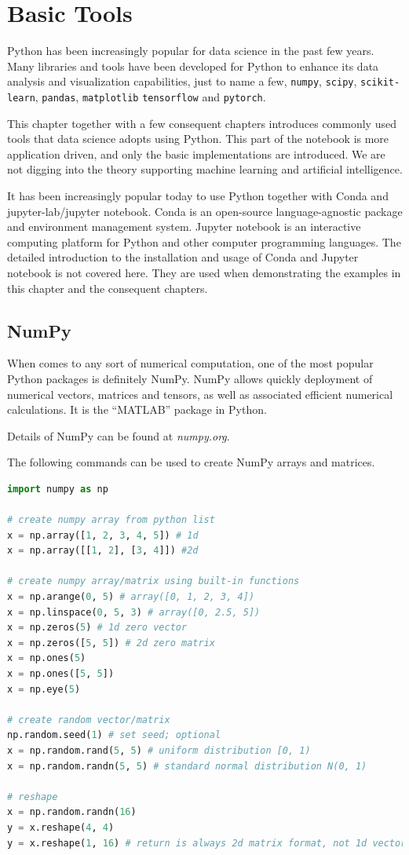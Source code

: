 \chapter{Basic Tools} \label{ch:numpyscipy}

Python has been increasingly popular for data science in the past few years. Many libraries and tools have been developed for Python to enhance its data analysis and visualization capabilities, just to name a few, \verb|numpy|, \verb|scipy|, \verb|scikit-learn|, \verb|pandas|, \verb|matplotlib| \verb|tensorflow| and \verb|pytorch|.

This chapter together with a few consequent chapters introduces commonly used tools that data science adopts using Python. This part of the notebook is more application driven, and only the basic implementations are introduced. We are not digging into the theory supporting machine learning and artificial intelligence.

It has been increasingly popular today to use Python together with Conda and jupyter-lab/jupyter notebook. Conda is an open-source language-agnostic package and environment management system. Jupyter notebook is an interactive computing platform for Python and other computer programming languages. The detailed introduction to the installation and usage of Conda and Jupyter notebook is not covered here. They are used when demonstrating the examples in this chapter and the consequent chapters.

\section{NumPy}

When comes to any sort of numerical computation, one of the most popular Python packages is definitely NumPy. NumPy allows quickly deployment of numerical vectors, matrices and tensors, as well as associated efficient numerical calculations. It is the ``MATLAB'' package in Python.

Details of NumPy can be found at \textit{numpy.org}.

The following commands can be used to create NumPy arrays and matrices.
\begin{lstlisting}[language=Python]
import numpy as np

# create numpy array from python list
x = np.array([1, 2, 3, 4, 5]) # 1d
x = np.array([[1, 2], [3, 4]]) #2d

# create numpy array/matrix using built-in functions
x = np.arange(0, 5) # array([0, 1, 2, 3, 4])
x = np.linspace(0, 5, 3) # array([0, 2.5, 5])
x = np.zeros(5) # 1d zero vector
x = np.zeros([5, 5]) # 2d zero matrix
x = np.ones(5)
x = np.ones([5, 5])
x = np.eye(5)

# create random vector/matrix
np.random.seed(1) # set seed; optional
x = np.random.rand(5, 5) # uniform distribution [0, 1)
x = np.random.randn(5, 5) # standard normal distribution N(0, 1)

# reshape
x = np.random.randn(16)
y = x.reshape(4, 4)
y = x.reshape(1, 16) # return is always 2d matrix format, not 1d vector format
\end{lstlisting}

